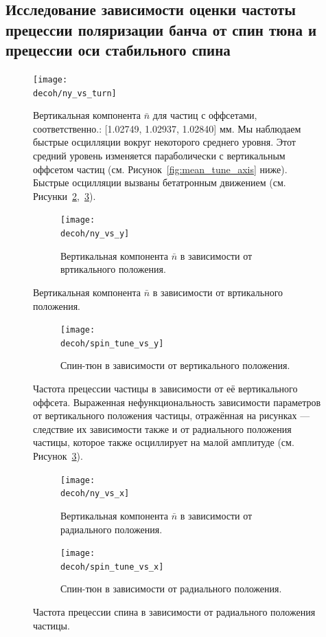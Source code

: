 \documentclass{report}
\newcommand{\Artem}{/Users/alexaksentyev/REPOS/COSYINF/img/Artem}
\newcommand{\decoh}{\Artem/decoherence_frequency_dependence}
\begin{document}
\subsection{Исследование зависимости оценки частоты прецессии поляризации банча от спин тюна и прецессии оси стабильного спина}

\begin{figure}[H]
  \centering
  \texttt{[image: \\decoh/ny\_vs\_turn]}
  \caption{Вертикальная компонента $\bar n$ для частиц с оффсетами,
    соответственно.: [1.02749, 1.02937, 1.02840] мм. Мы наблюдаем
    быстрые осцилляции вокруг некоторого среднего уровня. Этот средний
    уровень изменяется параболически с вертикальным оффсетом частиц
    (см. Рисунок~\ref{fig:mean_tune_axis} ниже). Быстрые осцилляции
    вызваны бетатронным движением (см. Рисунки~\ref{fig:tune_axis_position_y},~\ref{fig:tune_axis_position_x}).\label{fig:ny_vs_turn}}
\end{figure}

\begin{figure}[H]
  \centering
  \begin{subfigure}[b]{\textwidth}
    \texttt{[image: \\decoh/ny\_vs\_y]}
    \caption{Вертикальная компонента $\bar n$ в зависимости от
      вртикального положения.}
  \end{subfigure}
\end{figure}
\begin{figure}[H]\ContinuedFloat
  \begin{subfigure}[b]{\textwidth}
    \texttt{[image: \\decoh/spin\_tune\_vs\_y]}
    \caption{Спин-тюн в зависимости от вертикального положения.}
  \end{subfigure}
  \caption{Частота прецессии частицы в зависимости от её вертикального
    оффсета. Выраженная нефункциональность зависимости
    параметров от вертикального положения частицы, отражённая на
    рисунках --- следствие их зависимости также и от радиального положения
    частицы, которое также осциллирует на малой амплитуде (см. Рисунок~\ref{fig:tune_axis_position_x}). \label{fig:tune_axis_position_y}}
\end{figure}

\begin{figure}[H]
  \centering
  \begin{subfigure}[b]{\textwidth}
    \texttt{[image: \\decoh/ny\_vs\_x]}
    \caption{Вертикальная компонента $\bar n$ в зависимости от
      радиального положения.}
  \end{subfigure}

  \begin{subfigure}[b]{\textwidth}
    \texttt{[image: \\decoh/spin\_tune\_vs\_x]}
    \caption{Спин-тюн в зависимости от радиального положения.}
  \end{subfigure}
  \caption{Частота прецессии спина в зависимости от радиального
    положения частицы.\label{fig:tune_axis_position_x}}
\end{figure}
\end{document}
